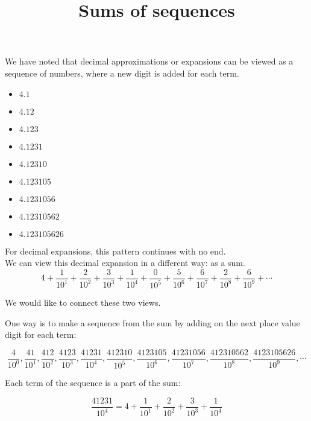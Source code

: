 \documentclass{ximera}
\title{Sums of sequences}
\begin{document}
\begin{abstract}
\end{abstract}

\maketitle




We have noted that decimal approximations or expansions can be viewed as a sequence of numbers, where a new digit is added for each term.


\begin{itemize}
\item $4.1$
\item $4.12$
\item $4.123$
\item $4.1231$
\item $4.12310$
\item $4.123105$
\item $4.1231056$
\item $4.12310562$
\item $4.123105626$
\end{itemize}


For decimal expansions, this pattern continues with no end. \\

We can view this decimal expansion in a different way: as a sum. \\


\[
4 + \frac{1}{10^1} + \frac{2}{10^2} + \frac{3}{10^3} + \frac{1}{10^4} + \frac{0}{10^5} + \frac{5}{10^6} + \frac{6}{10^7} + \frac{2}{10^8} + \frac{6}{10^9} + \cdots
\]



We would like to connect these two views.


One way is to make a sequence from the sum by adding on the next place value digit for each term:  

\[
\frac{4}{10^0}, \frac{41}{10^1},  \frac{412}{10^2}, \frac{4123}{10^3}, \frac{41231}{10^4}, \frac{412310}{10^5}, \frac{4123105}{10^6}, \frac{41231056}{10^7}, \frac{412310562}{10^8}, \frac{4123105626}{10^9}, \cdots
\]


Each term of the sequence is a part of the sum:



\[
\frac{41231}{10^4} = 4 + \frac{1}{10^1} + \frac{2}{10^2} + \frac{3}{10^3} + \frac{1}{10^4} 
\]
\end{document}
